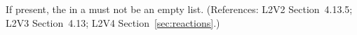 If present, the  in a \KineticLaw must not
be an empty list.  (References: L2V2 Section~4.13.5; L2V3
Section~4.13; L2V4 Section~\ref{sec:reactions}.)
